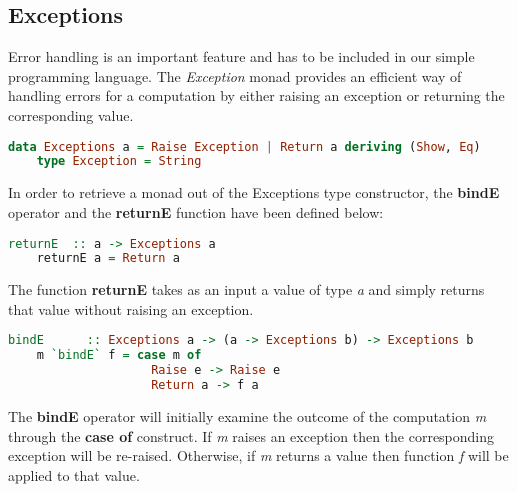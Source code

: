 \documentclass[a4paper, onecolumn]{article}
\begin{document}
    
    \subsection{Exceptions}
    
    Error handling is an important feature and has to be included in our simple programming language. The \textit{Exception} monad provides an efficient way of handling errors for a computation by either raising an exception or returning the corresponding value.  
    
    \begin{tcolorbox}
    \begin{lstlisting}[language=Haskell] 
    data Exceptions a = Raise Exception | Return a deriving (Show, Eq)
    type Exception = String 
    \end{lstlisting}
    \end{tcolorbox}
    
    \noindent In order to retrieve a monad out of the Exceptions type constructor, the \textbf{bindE} operator and the \textbf{returnE} function have been defined below: 
    
    \begin{tcolorbox}
    \begin{lstlisting}[language=Haskell] 
    returnE  :: a -> Exceptions a 
    returnE a = Return a
    \end{lstlisting}
    \end{tcolorbox}
    
    \noindent The function \textbf{returnE} takes as an input a value of type \textit{a} and simply returns that value without raising an exception.
    
    \begin{tcolorbox}
    \begin{lstlisting}[language=Haskell] 
    bindE      :: Exceptions a -> (a -> Exceptions b) -> Exceptions b
    m `bindE` f = case m of 
                    Raise e -> Raise e 
                    Return a -> f a
    \end{lstlisting}
    \end{tcolorbox}
    
    \noindent The \textbf{bindE} operator will initially examine the outcome of the computation \textit{m} through the \textbf{case of} construct. If \textit{m} raises an exception then the corresponding exception will be re-raised. Otherwise, if \textit{m} returns a value then function \textit{f} will be applied to that value. 
    
    
\end{document}
